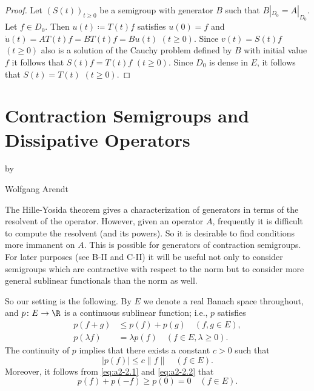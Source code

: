 \begin{proof}
Let $(S(t))_{t\geq 0}$ be a semigroup with generator $B$ such that $B|_{D_{0}} = A|_{D_{0}}$.
Let $f \in D_{0}$.
Then $u(t) \coloneqq T(t)f$ satisfies $u(0) = f$ and $\dot{u}(t) = AT(t)f = BT(t)f = Bu(t)$ $(t \geq 0)$.
Since $v(t) = S(t)f$ $(t \geq 0)$ also is a solution of the Cauchy problem defined by $B$ with initial value $f$ it follows that $S(t)f = T(t)f$ $(t\geq 0)$.
Since $D_{0}$ is dense in $E$, it follows that $S(t) = T(t)$ $(t \geq 0)$.
\end{proof}
\section{Contraction Semigroups and Dissipative Operators}\label{sec:a2-2}
\begin{center}
by

Wolfgang Arendt
\end{center}
The Hille-Yosida theorem gives a characterization of generators in terms of the resolvent of the operator.
However, given an operator $A$, frequently it is difficult to compute the resolvent (and its powers).
So it is desirable to find conditions more immanent on $A$.
This is possible for generators of contraction semigroups.
For later purposes (see B-II and C-II) it will be useful not only to consider semigroups which are contractive with respect to the norm but to consider more general sublinear functionals than the norm as well.

So our setting is the following.
By $E$ we denote a real Banach space throughout, and $p \colon E \to \R$ is a continuous sublinear function; i.e., $p$ satisfies
\begin{align}
p(f+g) &\leq p(f) + p(g) \quad (f, g \in E), \label{eq:a2-2.1} \\
p(\lambda f) &= \lambda p(f) \quad (f \in E, \lambda \geq 0).\label{eq:a2-2.2}
\end{align}
The continuity of $p$ implies that there exists a constant $c > 0$ such that
\begin{equation}\label{eq:a2-2.3}
|p(f)| \leq c\|f\| \quad (f \in E).
\end{equation}
Moreover, it follows from \eqref{eq:a2-2.1} and \eqref{eq:a2-2.2} that
\begin{equation}\label{eq:a2-2.4}
p(f) + p(-f) \geq p(0) = 0 \quad (f \in E).
\end{equation}

